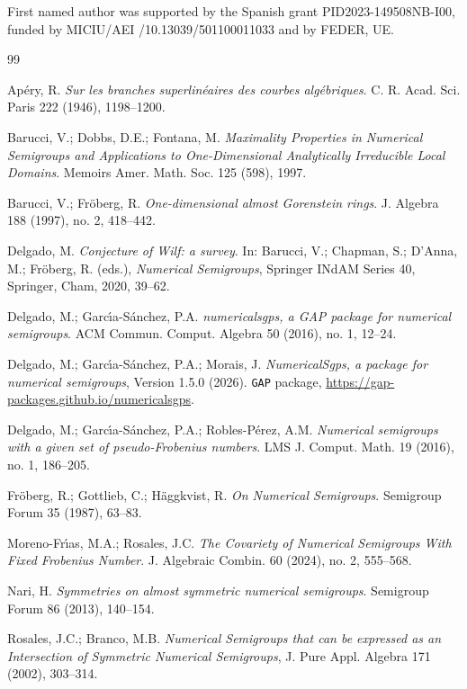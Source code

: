 \documentclass[11pt]{article}
\numberwithin{equation}{section}
\begin{document}
 First named author was supported by the Spanish grant PID2023-149508NB-I00, funded by MICIU/AEI /10.13039/501100011033 and by FEDER, UE.
\begin{thebibliography}{99}

 Ap\'ery, R. \textit{Sur les branches superlinéaires des courbes algébriques}. C. R. Acad. Sci. Paris 222 (1946), 1198--1200.

 Barucci, V.; Dobbs, D.E.; Fontana, M. \textit{Maximality Properties in Numerical Semigroups and Applications to One-Dimensional Analytically Irreducible Local Domains}. Memoirs Amer. Math. Soc. 125 (598), 1997.

 Barucci, V.; Fr\"oberg, R. \textit{One-dimensional almost Gorenstein rings}. J. Algebra 188 (1997), no. 2, 418--442.

 Delgado, M. \textit{Conjecture of Wilf: a survey}. In: Barucci, V.; Chapman, S.; D'Anna, M.; Fr\"oberg, R. (eds.), \textit{Numerical Semigroups}, Springer INdAM Series 40, Springer, Cham, 2020, 39--62.

 Delgado, M.; Garc\'{\i}a-S\'anchez, P.A. \textit{numericalsgps, a GAP package for numerical semigroups}. ACM Commun. Comput. Algebra 50 (2016), no. 1, 12--24.

 Delgado, M.; Garc\'{\i}a-S\'anchez, P.A.; Morais, J. \textit{NumericalSgps, a package for numerical semigroups}, Version 1.5.0 (2026). \texttt{GAP} package, \url{https://gap-packages.github.io/numericalsgps}.

 Delgado, M.; Garc\'{\i}a-S\'anchez, P.A.; Robles-P\'erez, A.M. \textit{Numerical semigroups with a given set of pseudo-Frobenius numbers}. LMS J. Comput. Math. 19 (2016), no. 1, 186--205.

 Fr\"oberg, R.; Gottlieb, C.; H\"aggkvist, R. \textit{On Numerical Semigroups}. Semigroup Forum 35 (1987), 63--83.

 Moreno-Fr\'{\i}as, M.A.; Rosales, J.C. \textit{The Covariety of Numerical Semigroups With Fixed Frobenius Number}. J. Algebraic Combin. 60 (2024), no. 2, 555--568.

 Nari, H. \textit{Symmetries on almost symmetric numerical semigroups}. Semigroup Forum 86 (2013), 140--154.

 Rosales, J.C.; Branco, M.B. \textit{Numerical Semigroups that can be expressed as an Intersection of Symmetric Numerical Semigroups}, J. Pure Appl. Algebra 171 (2002), 303--314.


\end{thebibliography}
\end{document}
